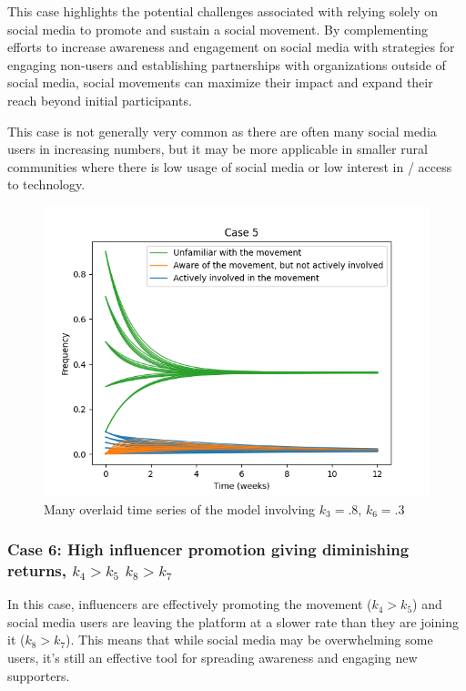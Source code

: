 \documentclass{article}
\begin{document}
    This case highlights the potential challenges associated with relying solely on social media to promote and sustain a social movement. By complementing efforts to increase awareness and engagement on social media with strategies for engaging non-users and establishing partnerships with organizations outside of social media, social movements can maximize their impact and expand their reach beyond initial participants.
    
    This case is not generally very common as there are often many social media users in increasing numbers, but it may be more applicable in smaller rural communities where there is low usage of social media or low interest in / access to technology.

    \begin{figure}[H]

        \centering
        \includegraphics[width=\textwidth]{simulation/plots/case5.png}   
        \caption{Many overlaid time series of the model involving \mbox{$k_3=.8$}, \mbox{$k_6=.3$}}
        \label{fig:case5}
    \end{figure}


    \subsubsection*{Case 6: High influencer promotion giving diminishing returns, $k_4 > k_5$  $k_8 > k_7$}
    In this case, influencers are effectively promoting the movement ($k_4 > k_5$) and social media users are leaving the platform at a slower rate than they are joining it ($k_8 > k_7$). This means that while social media may be overwhelming some users, it's still an effective tool for spreading awareness and engaging new supporters.
\end{document}
